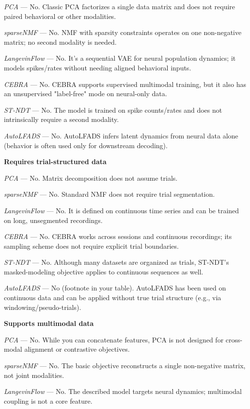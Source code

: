 \textit{PCA} — No. Classic PCA factorizes a single data matrix and does not require paired behavioral or other modalities.

\textit{sparseNMF} — No. NMF with sparsity constraints operates on one non-negative matrix; no second modality is needed.

\textit{LangevinFlow} — No. It's a sequential VAE for neural population dynamics; it models spikes/rates without needing aligned behavioral inputs.

\textit{CEBRA} — No. CEBRA supports supervised multimodal training, but it also has an unsupervised "label-free" mode on neural-only data.

\textit{ST-NDT} — No. The model is trained on spike counts/rates and does not intrinsically require a second modality.

\textit{AutoLFADS} — No. AutoLFADS infers latent dynamics from neural data alone (behavior is often used only for downstream decoding).

\textbf{Requires trial-structured data}

\textit{PCA} — No. Matrix decomposition does not assume trials.

\textit{sparseNMF} — No. Standard NMF does not require trial segmentation.

\textit{LangevinFlow} — No. It is defined on continuous time series and can be trained on long, unsegmented recordings.

\textit{CEBRA} — No. CEBRA works across sessions and continuous recordings; its sampling scheme does not require explicit trial boundaries.

\textit{ST-NDT} — No. Although many datasets are organized as trials, ST-NDT's masked-modeling objective applies to continuous sequences as well.

\textit{AutoLFADS} — No (footnote in your table). AutoLFADS has been used on continuous data and can be applied without true trial structure (e.g., via windowing/pseudo-trials).

\textbf{Supports multimodal data}

\textit{PCA} — No. While you can concatenate features, PCA is not designed for cross-modal alignment or contrastive objectives.

\textit{sparseNMF} — No. The basic objective reconstructs a single non-negative matrix, not joint modalities.

\textit{LangevinFlow} — No. The described model targets neural dynamics; multimodal coupling is not a core feature.

